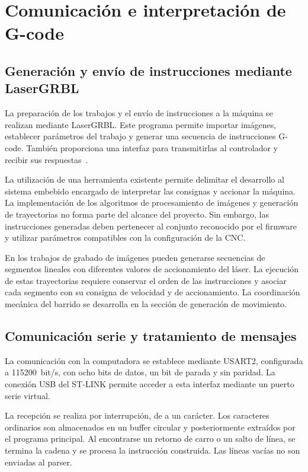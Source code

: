 \documentclass[blue,fullpaper]{ludusofficial}  %
\begin{document}
\section{Comunicación e interpretación de G-code}
\label{sec:comunicacion}

\subsection{Generación y envío de instrucciones mediante LaserGRBL}

La preparación de los trabajos y el envío de instrucciones
a la máquina se realizan mediante LaserGRBL. Este programa
permite importar imágenes, establecer parámetros del trabajo
y generar una secuencia de instrucciones G-code. También
proporciona una interfaz para transmitirlas al controlador
y recibir sus respuestas~\cite{lasergrbl_import}.

La utilización de una herramienta existente permite
delimitar el desarrollo al sistema embebido encargado
de interpretar las consignas y accionar la máquina.
La implementación de los algoritmos de procesamiento
de imágenes y generación de trayectorias no forma parte
del alcance del proyecto. Sin embargo, las instrucciones
generadas deben pertenecer al conjunto reconocido por
el firmware y utilizar parámetros compatibles con
la configuración de la CNC.

En los trabajos de grabado de imágenes pueden generarse
secuencias de segmentos lineales con diferentes valores
de accionamiento del láser. La ejecución de estas
trayectorias requiere conservar el orden de las instrucciones
y asociar cada segmento con su consigna de velocidad
y de accionamiento. La coordinación mecánica del barrido
se desarrolla en la sección de generación de movimiento.

\subsection{Comunicación serie y tratamiento de mensajes}

La comunicación con la computadora se establece mediante
USART2, configurada a 115200~bit/s, con ocho bits de datos,
un bit de parada y sin paridad. La conexión USB del ST-LINK
permite acceder a esta interfaz mediante un puerto
serie virtual.

La recepción se realiza por interrupción, de a un carácter.
Los caracteres ordinarios son almacenados en un buffer
circular y posteriormente extraídos por el programa
principal. Al encontrarse un retorno de carro o un salto
de línea, se termina la cadena y se procesa la instrucción
construida. Las líneas vacías no son enviadas al parser.
\end{document}
